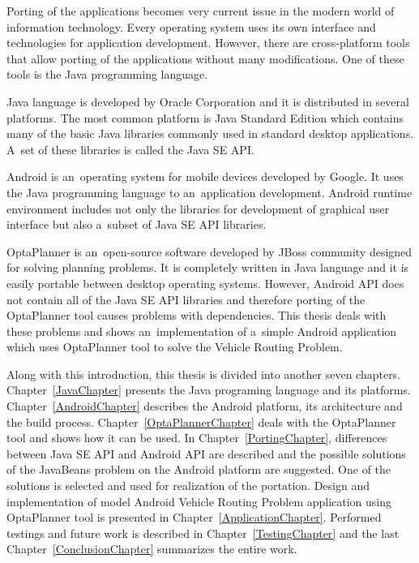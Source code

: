 Porting of the applications becomes very current issue in the modern world of information technology. Every operating
system uses its own interface and technologies for application development. However, there are cross-platform tools that
allow porting of the applications without many modifications. One of these tools is the Java programming language.

Java language is developed by Oracle Corporation and it is distributed in several platforms. The most common platform is
Java Standard Edition which contains many of the basic Java libraries commonly used in standard desktop applications.
A~set of these libraries is called the Java SE API.

Android is an~operating system for mobile devices developed by Google. It uses the Java programming language to
an~application development. Android runtime environment includes not only the libraries for development of graphical
user interface but also a~subset of Java SE API libraries.

OptaPlanner is an~open-source software developed by JBoss community designed for solving planning problems. It is
completely written in Java language and it is easily portable between desktop operating systems. However, Android API
does not contain all of the Java SE API libraries and therefore porting of the OptaPlanner tool causes problems with
dependencies. This thesis deals with these problems and shows an~implementation of a~simple Android application which
uses OptaPlanner tool to solve the Vehicle Routing Problem.

Along with this introduction, this thesis is divided into another seven chapters. Chapter~\ref{JavaChapter} presents the
Java programing language and its platforms. Chapter~\ref{AndroidChapter} describes the Android platform, its
architecture and the build process. Chapter~\ref{OptaPlannerChapter} deals with the OptaPlanner tool and shows how it
can be used. In Chapter~\ref{PortingChapter}, differences between Java SE API and Android API are described and the
possible solutions of the JavaBeans problem on the Android platform are suggested. One of the solutions is selected and
used for realization of the portation. Design and implementation of model Android Vehicle Routing Problem application
using OptaPlanner tool is presented in Chapter~\ref{ApplicationChapter}. Performed testings and future work is
described in Chapter~\ref{TestingChapter} and the last Chapter~\ref{ConclusionChapter} summarizes the entire work.
